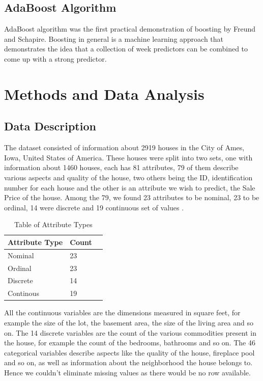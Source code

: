 \documentclass[fleqn,10pt]{SelfArx} %
\begin{document}
	\subsection{AdaBoost Algorithm}
	AdaBoost algorithm was the first practical demonstration of boosting by Freund and Schapire\cite{adaboost}. Boosting in general is a machine learning approach that demonstrates the idea that a collection of week predictors can be combined to come up with a strong predictor. 
	
	
	\section{Methods and Data Analysis}
	
	\subsection{Data Description}
	The dataset consisted of information about 2919 houses in the City of Ames, Iowa, United States of America. These houses were split into two sets, one  with information about 1460 houses, each has 81 attributes, 79 of them describe various aspects and quality of the house, two others being the ID, identification number for each house and the other is an attribute we wish to predict, the Sale Price of the house. Among the 79, we found 23 attributes to be nominal, 23 to be ordinal, 14 were discrete and 19 continuous set of values \cite{dataset}.\\
	
	\begin{table}[hbt]
		\caption{Table of Attribute Types}
		\centering
		\begin{tabular}{llr}
			\cmidrule(r){1-2}
			Attribute Type & Count \\
			\midrule
			Nominal & 23 \\
			Ordinal & 23 \\
			Discrete & 14 \\
			Continous & 19
		\end{tabular}
		\label{tab:label}
	\end{table}
	
	All the continuous variables are the dimensions measured in square feet, for example the size of the lot, the basement area, the size of the living area and so on. The 14 discrete variables are the count of the various commodities present in the house, for example the count of the bedrooms, bathrooms and so on. The 46 categorical variables describe aspects like the quality of the house, fireplace pool and so on, as well as information about the neighborhood the house belongs to. Hence we couldn't eliminate missing values as there would be no row available.\\
	
\end{document}
